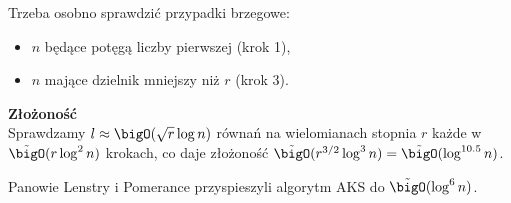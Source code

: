 Trzeba osobno sprawdzić przypadki brzegowe:
\begin{itemize}
    \item \( n \) będące potęgą liczby pierwszej (krok 1),
    \item \( n \) mające dzielnik mniejszy niż \( r \) (krok 3).
\end{itemize}

\textbf{Złożoność} \\
Sprawdzamy \( l \approx \bigO(\sqrt{r} \log n) \) równań na wielomianach stopnia \( r \) każde w \( \Tilde{\bigO}(r \log^2n) \) krokach, co daje złożoność \( \Tilde{\bigO}(r^{3/2} \log^3n) = \Tilde{\bigO}(\log^{10.5}n)\).

Panowie Lenstry i Pomerance przyspieszyli algorytm AKS do \( \Tilde{\bigO}(\log^6n) \).
